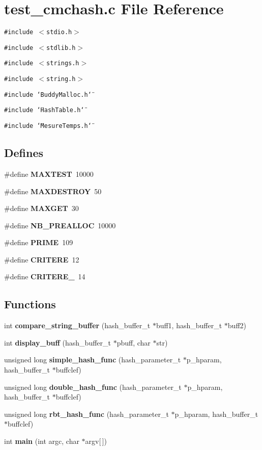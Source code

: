 \section{test\_\-cmchash.c File Reference}
\label{test__cmchash_8c}
{\tt \#include $<$stdio.h$>$}\par
{\tt \#include $<$stdlib.h$>$}\par
{\tt \#include $<$strings.h$>$}\par
{\tt \#include $<$string.h$>$}\par
{\tt \#include \char`\"{}Buddy\-Malloc.h\char`\"{}}\par
{\tt \#include \char`\"{}Hash\-Table.h\char`\"{}}\par
{\tt \#include \char`\"{}Mesure\-Temps.h\char`\"{}}\par
\subsection*{Defines}
\begin{CompactItemize}
\item 
\#define {\bf MAXTEST}\ 10000
\item 
\#define {\bf MAXDESTROY}\ 50
\item 
\#define {\bf MAXGET}\ 30
\item 
\#define {\bf NB\_\-PREALLOC}\ 10000
\item 
\#define {\bf PRIME}\ 109
\item 
\#define {\bf CRITERE}\ 12
\item 
\#define {\bf CRITERE\_}\ 14
\end{CompactItemize}
\subsection*{Functions}
\begin{CompactItemize}
\item 
int {\bf compare\_\-string\_\-buffer} (hash\_\-buffer\_\-t $\ast$buff1, hash\_\-buffer\_\-t $\ast$buff2)
\item 
int {\bf display\_\-buff} (hash\_\-buffer\_\-t $\ast$pbuff, char $\ast$str)
\item 
unsigned long {\bf simple\_\-hash\_\-func} (hash\_\-parameter\_\-t $\ast$p\_\-hparam, hash\_\-buffer\_\-t $\ast$buffclef)
\item 
unsigned long {\bf double\_\-hash\_\-func} (hash\_\-parameter\_\-t $\ast$p\_\-hparam, hash\_\-buffer\_\-t $\ast$buffclef)
\item 
unsigned long {\bf rbt\_\-hash\_\-func} (hash\_\-parameter\_\-t $\ast$p\_\-hparam, hash\_\-buffer\_\-t $\ast$buffclef)
\item 
int {\bf main} (int argc, char $\ast$argv[$\,$])
\end{CompactItemize}


